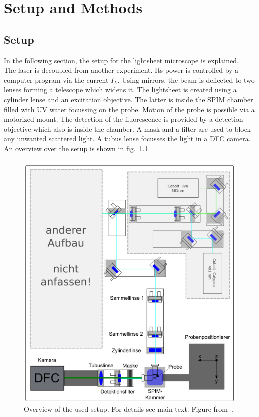 

\def\skalierung{0.65}

\chapter{Setup and Methods}
\label{chap:methods}
\section{Setup}\label{sec:setup}
In the following section, the setup for the lightsheet microscope is explained. \\
The laser is decoupled from another experiment. Its power is controlled by a computer program via the current $I_L$. Using mirrors, the beam is deflected to two lenses forming a telescope which widens it. The lightsheet is created using a cylinder lense and an excitation objective. The latter is inside the SPIM chamber filled with UV water focussing on the probe. Motion of the probe is possible via a motorized mount. The detection of the fluorescence is provided by a detection objective which also is inside the chamber. A mask and a filter are used to block any unwanted scattered light. A tubus lense focusses the light in a DFC camera. An overview over the setup is shown in fig.~\ref{fig:setup}.

\begin{figure}[ht]
    \centering
    \includegraphics[width = \textwidth]{Bilder/Setup/setup.png}
    \caption{Overview of the used setup. For details see main text. Figure from~\cite{Struntz.2017}.}
    \label{fig:setup}
\end{figure}


